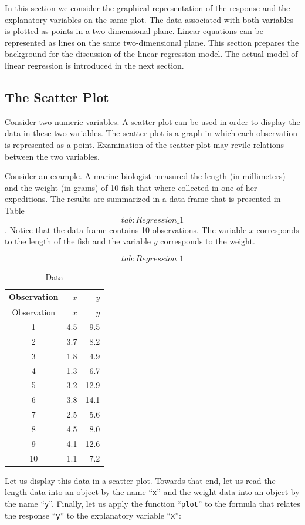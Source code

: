 \documentclass[]{krantz}
\theoremstyle{definition}
\theoremstyle{definition}
\theoremstyle{definition}
\theoremstyle{remark}
\begin{document}
In this section we consider the graphical representation of the response
and the explanatory variables on the same plot. The data associated with
both variables is plotted as points in a two-dimensional plane. Linear
equations can be represented as lines on the same two-dimensional plane.
This section prepares the background for the discussion of the linear
regression model. The actual model of linear regression is introduced in
the next section.

\subsection{The Scatter Plot}\label{the-scatter-plot}

Consider two numeric variables. A scatter plot can be used in order to
display the data in these two variables. The scatter plot is a graph in
which each observation is represented as a point. Examination of the
scatter plot may revile relations between the two variables.

Consider an example. A marine biologist measured the length (in
millimeters) and the weight (in grams) of 10 fish that where collected
in one of her expeditions. The results are summarized in a data frame
that is presented in Table~\[tab:Regression\_1\]. Notice that the data
frame contains 10 observations. The variable \(x\) corresponds to the
length of the fish and the variable \(y\) corresponds to the weight.

\[tab:Regression\_1\]

\begin{longtable}[]{@{}crr@{}}
\caption{Data}\tabularnewline
\toprule
Observation & \(x\) & \(y\)\tabularnewline
\midrule
\endfirsthead
\toprule
Observation & \(x\) & \(y\)\tabularnewline
\midrule
\endhead
1 & 4.5 & 9.5\tabularnewline
2 & 3.7 & 8.2\tabularnewline
3 & 1.8 & 4.9\tabularnewline
4 & 1.3 & 6.7\tabularnewline
5 & 3.2 & 12.9\tabularnewline
6 & 3.8 & 14.1\tabularnewline
7 & 2.5 & 5.6\tabularnewline
8 & 4.5 & 8.0\tabularnewline
9 & 4.1 & 12.6\tabularnewline
10 & 1.1 & 7.2\tabularnewline
\bottomrule
\end{longtable}

Let us display this data in a scatter plot. Towards that end, let us
read the length data into an object by the name ``\texttt{x}'' and the
weight data into an object by the name ``\texttt{y}''. Finally, let us
apply the function ``\texttt{plot}'' to the formula that relates the
response ``\texttt{y}'' to the explanatory variable ``\texttt{x}'':
\end{document}
